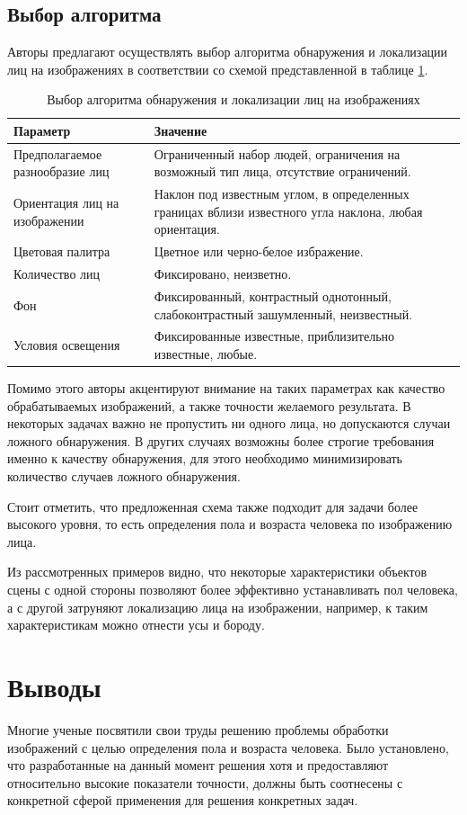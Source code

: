 \subsection{Выбор алгоритма}
Авторы \cite{Veznevec_Degtyareva} предлагают осуществлять выбор алгоритма
обнаружения и локализации лиц на изображениях в соответствии со схемой
представленной в таблице \ref{tab:chose_algo}.

\begin{table}[ht]
  \caption{Выбор алгоритма обнаружения и локализации лиц на изображениях}
  \begin{tabular}{|p{}|p{}|}
  \hline
  Параметр & Значение \\ 
  \hline
  Предполагаемое разнообразие лиц & Ограниченный набор людей, ограничения на
возможный тип лица, отсутствие ограничений. \\ 
  \hline
  Ориентация лиц на изображении & Наклон под известным
углом, в определенных границах вблизи известного угла наклона, любая
ориентация. \\
  \hline
  Цветовая палитра & Цветное или черно-белое избражение. \\
  \hline
  Количество лиц & Фиксировано, неизветно. \\
  \hline
  Фон & Фиксированный, контрастный однотонный, слабоконтрастный зашумленный,
неизвестный. \\
  \hline
  Условия освещения & Фиксированные известные, приблизительно известные, любые.
  \\
  \hline
  \end{tabular}
  \label{tab:chose_algo}
\end{table}

Помимо этого авторы акцентируют внимание на таких параметрах как качество
обрабатываемых изображений, а также точности желаемого результата. В некоторых
задачах важно не пропустить ни одного лица, но допускаются случаи ложного
обнаружения. В других случаях возможны более строгие требования именно к
качеству обнаружения, для этого необходимо минимизировать количество случаев
ложного обнаружения.

Стоит отметить, что предложенная схема также подходит для задачи более высокого
уровня, то есть определения пола и возраста человека по изображению лица.

Из рассмотренных примеров видно, что некоторые характеристики объектов сцены
с одной стороны позволяют более эффективно устанавливать пол человека, а с
другой затруняют локализацию лица на изображении, например, к таким
характеристикам можно отнести усы и бороду.




\section{Выводы}
Многие ученые посвятили свои труды решению проблемы обработки изображений с
целью определения пола и возраста человека. Было установлено, что разработанные
на данный момент решения хотя и предоставляют относительно высокие показатели
точности, должны быть соотнесены с конкретной сферой применения для решения
конкретных задач.


